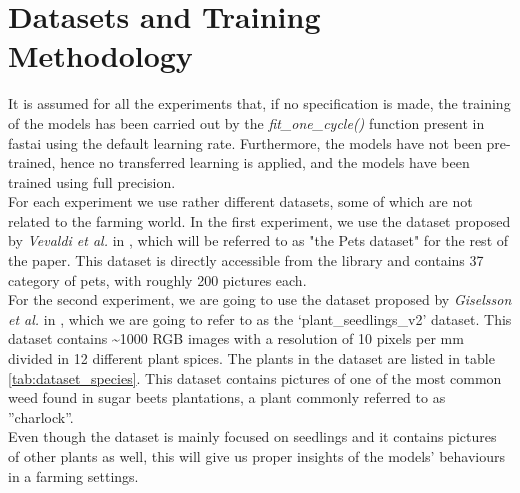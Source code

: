 \section{Datasets and Training Methodology}\label{sec:data_models}
It is assumed for all the experiments that, if no specification is made, the training of the models has been carried out by the \textit{fit\_one\_cycle()} function present in fastai using the default learning rate. Furthermore, the models have not been pre-trained, hence no transferred learning is applied, and the models have been trained using full precision. \\
For each experiment we use rather different datasets, some of which are not related to the farming world. In the first experiment, we use the dataset proposed by \textit{Vevaldi et al.} in \cite{parkhi12a}, which will be referred to as "the Pets dataset" for the rest of the paper. This dataset is directly accessible from the library and contains 37 category of pets, with roughly 200 pictures each. \\
For the second experiment, we are going to use the dataset proposed by \textit{Giselsson et al.} in \cite{giselsson2017public}, which we are going to refer to as the ‘plant\_seedlings\_v2’ dataset. This dataset contains \textasciitilde 1000 RGB images with a resolution of 10 pixels per mm divided in 12 different plant spices. The plants in the dataset are listed in table \ref{tab:dataset_species}. This dataset contains pictures of one of the most common weed found in sugar beets plantations, a plant commonly referred to as ''charlock''. \cite{cioni_weed_2010}\\
Even though the dataset is mainly focused on seedlings and it contains pictures of other plants as well, this will give us proper insights of the models' behaviours in a farming settings. 
